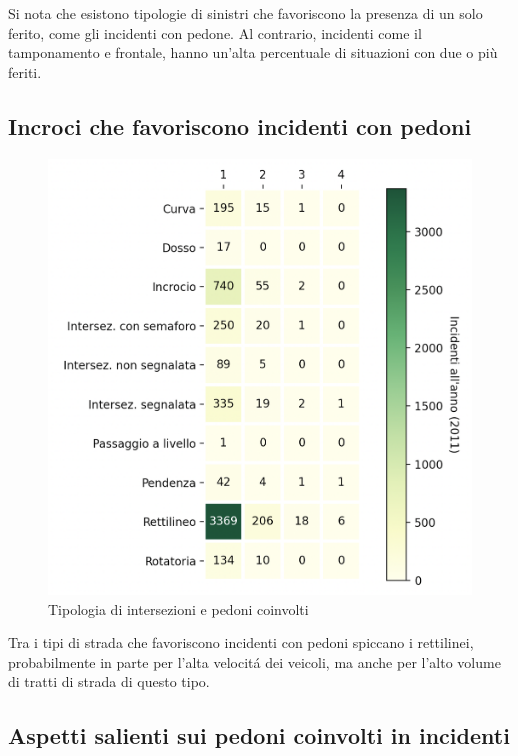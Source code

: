 \documentclass[a4paper]{report}
\begin{document}
Si nota che esistono tipologie di sinistri che favoriscono la presenza di un solo ferito, 
come gli incidenti con pedone. Al contrario, incidenti come il tamponamento e frontale, 
hanno un'alta percentuale di situazioni con due o più feriti.


\subsection{Incroci che favoriscono incidenti con pedoni}

\begin{figure}
    \includegraphics[width=\linewidth]{../src/incidenti/incidenti_senza_coords/pedoni/pedoni_incroci.png}
    \caption{Tipologia di intersezioni e pedoni coinvolti}
    \label{fig:pedoni_intersezioni}
\end{figure}

Tra i tipi di strada che favoriscono incidenti con pedoni spiccano i rettilinei, 
probabilmente in parte per l'alta velocit\'a dei veicoli, ma anche per l'alto volume di
tratti di strada di questo tipo.


\subsection{Aspetti salienti sui pedoni coinvolti in incidenti}
\end{document}
